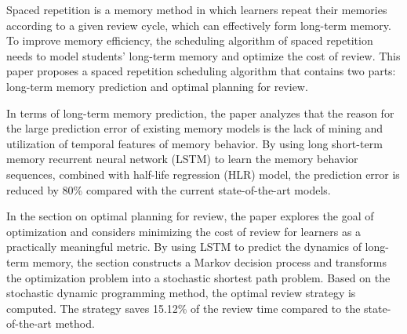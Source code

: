 \begin{eabstract}
  Spaced repetition is a memory method in which learners repeat their memories according to a given review cycle, which can effectively form long-term memory. To improve memory efficiency, the scheduling algorithm of spaced repetition needs to model students' long-term memory and optimize the cost of review. This paper proposes a spaced repetition scheduling algorithm that contains two parts: long-term memory prediction and optimal planning for review.

  In terms of long-term memory prediction, the paper analyzes that the reason for the large prediction error of existing memory models is the lack of mining and utilization of temporal features of memory behavior. By using long short-term memory recurrent neural network (LSTM) to learn the memory behavior sequences, combined with half-life regression (HLR) model, the prediction error is reduced by 80\% compared with the current state-of-the-art models.

  In the section on optimal planning for review, the paper explores the goal of optimization and considers minimizing the cost of review for learners as a practically meaningful metric. By using LSTM to predict the dynamics of long-term memory, the section constructs a Markov decision process and transforms the optimization problem into a stochastic shortest path problem. Based on the stochastic dynamic programming method, the optimal review strategy is computed. The strategy saves 15.12\% of the review time compared to the state-of-the-art method.
\end{eabstract}
